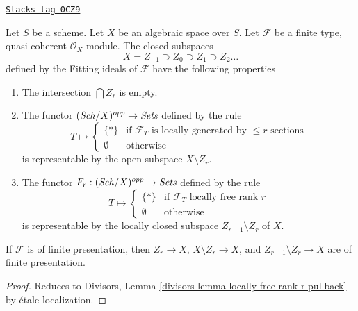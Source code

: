\begin{lemma}
\label{spaces-divisors-lemma-locally-free-rank-r-pullback}
\href{https://stacks.math.columbia.edu/tag/0CZ9}{\texttt{Stacks tag 0CZ9}}

Let $S$ be a scheme. Let $X$ be an algebraic space over $S$.
Let $\mathcal{F}$ be a finite type, quasi-coherent
$\mathcal{O}_X$-module. The closed subspaces
$$
X = Z_{-1} \supset Z_0 \supset Z_1 \supset Z_2 \ldots
$$
defined by the Fitting ideals of $\mathcal{F}$ have the following
properties
\begin{enumerate}
\item The intersection $\bigcap Z_r$ is empty.
\item The functor $(\mathit{Sch}/X)^{opp} \to \textit{Sets}$ defined by the rule
$$
T \longmapsto
\left\{
\begin{matrix}
\{*\} & \text{if }\mathcal{F}_T\text{ is locally generated by }
\leq r\text{ sections} \\
\emptyset & \text{otherwise}
\end{matrix}
\right.
$$
is representable by the open subspace $X \setminus Z_r$.
\item The functor $F_r : (\mathit{Sch}/X)^{opp} \to \textit{Sets}$ defined by the rule
$$
T \longmapsto
\left\{
\begin{matrix}
\{*\} & \text{if }\mathcal{F}_T\text{ locally free rank }r\\
\emptyset & \text{otherwise}
\end{matrix}
\right.
$$
is representable by the locally closed subspace $Z_{r - 1} \setminus Z_r$
of $X$.
\end{enumerate}
If $\mathcal{F}$ is of finite presentation, then
$Z_r \to X$, $X \setminus Z_r \to X$, and $Z_{r - 1} \setminus Z_r \to X$
are of finite presentation.
\end{lemma}

\begin{proof}
Reduces to
Divisors, Lemma \ref{divisors-lemma-locally-free-rank-r-pullback}
by \'etale localization.
\end{proof}

